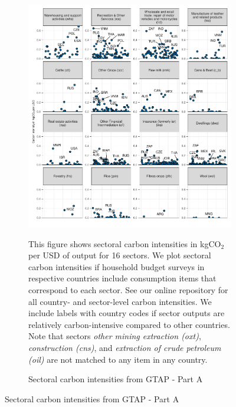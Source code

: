 \begin{figure}[ht!]
  \centering
  \caption{Sectoral carbon intensities from GTAP} \label{fig:GTAP}\label{fig:B}
  \begin{subfigure}[b]{\textwidth}
  \centering
  \includegraphics{Analysis_Carbon_Intensities_GTAP/Figure_2.1.1_A_2017B.pdf}
  \caption{Sectoral carbon intensities from GTAP - Part A} \label{fig:B1}  
  \begin{subcaption2}
    This figure shows sectoral carbon intensities in kgCO$_{2}$ per USD of output for 16 sectors. We plot sectoral carbon intensities if household budget surveys in respective countries include consumption items that correspond to each sector. See our online repository for all country- and sector-level carbon intensities. We include labels with country codes if sector outputs are relatively carbon-intensive compared to other countries. Note that sectors \textit{other mining extraction (oxt)}, \textit{construction (cns)}, and \textit{extraction of crude petroleum (oil)} are not matched to any item in any country.
  \end{subcaption2}
\end{subfigure}
\end{figure}

